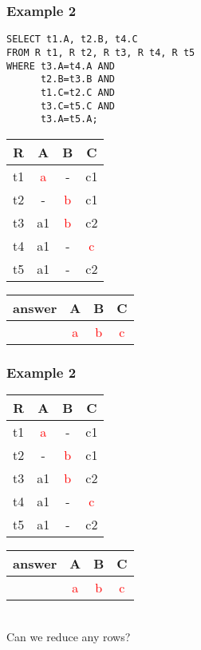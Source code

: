 \documentclass{beamer}
\begin{document}
\begin{frame}[fragile]
  \frametitle{Example 2}
\begin{verbatim}  
SELECT t1.A, t2.B, t4.C
FROM R t1, R t2, R t3, R t4, R t5
WHERE t3.A=t4.A AND
      t2.B=t3.B AND
      t1.C=t2.C AND
      t3.C=t5.C AND
      t3.A=t5.A;
\end{verbatim} 
  \begin{tabular}{ c | c c c}
  R & A & B & C \\
  \hline
  t1 & \textcolor{red}{a}  & -  & c1 \\
  t2 & -  & \textcolor{red}{b}  & c1 \\
  t3 & a1 & \textcolor{red}{b} & c2 \\
  t4 & a1 & - & \textcolor{red}{c} \\
  t5 & a1 & - & c2 \\
  \end{tabular}
  \begin{tabular}{ c | c c c}
  answer & A & B & C \\
  \hline
   & \textcolor{red}{a}& \textcolor{red}{b}& \textcolor{red}{c}\\
  \end{tabular}
\end{frame}

\begin{frame}
  \frametitle{Example 2}
  \begin{tabular}{ c | c c c}
  R & A & B & C \\
  \hline
  t1 & \textcolor{red}{a}  & -  & c1 \\
  t2 & -  & \textcolor{red}{b}  & c1 \\
  t3 & a1 & \textcolor{red}{b} & c2 \\
  t4 & a1 & - & \textcolor{red}{c} \\
  t5 & a1 & - & c2 \\
  \end{tabular}
  \begin{tabular}{ c | c c c}
  answer & A & B & C \\
  \hline
   & \textcolor{red}{a}& \textcolor{red}{b}& \textcolor{red}{c}\\
  \end{tabular}
  \hfill \\
  Can we reduce any rows?
\end{frame}
\end{document}

